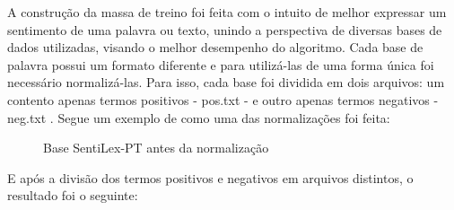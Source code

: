 A construção da massa de treino foi feita com o intuito de melhor expressar um sentimento de uma palavra ou texto, unindo a perspectiva de diversas bases de dados utilizadas, visando o melhor desempenho do algoritmo. Cada base de palavra possui um formato diferente e para utilizá-las de uma forma única foi necessário normalizá-las. Para isso, cada base foi dividida em dois arquivos: um contento apenas termos positivos - pos.txt - e outro apenas termos negativos - neg.txt . Segue um exemplo de como uma das normalizações foi feita:


\begin{figure}[H]
	\centering{}
	\caption{Base SentiLex-PT antes da normalização }
	\label{sentilex}
\end{figure}

E após a divisão dos termos positivos e negativos em arquivos distintos, o resultado foi o seguinte:


